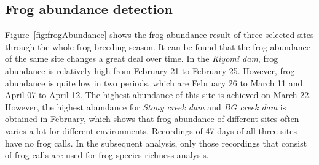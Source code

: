 \subsection{Frog abundance detection}
Figure~\ref{fig:frogAbundance} shows the frog abundance result of three selected sites through the whole frog breeding season. It can be found that the frog abundance of the same site changes a great deal over time. In the \textit{Kiyomi dam}, frog abundance is relatively high from February 21 to February 25. However, frog abundance is quite low in two periods, which are February 26 to March 11 and April 07 to April 12. The highest abundance of this site is achieved on March 22. However, the highest abundance for \textit{Stony creek dam} and \textit{BG creek dam} is obtained in February, which shows that frog abundance of different sites often varies a lot for different environments. Recordings of 47 days of all three sites have no frog calls. In the subsequent analysis, only those recordings that consist of frog calls are used for frog species richness analysis. 

